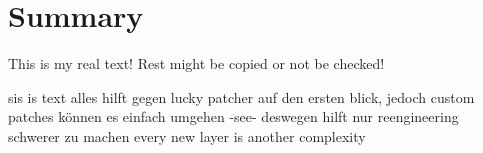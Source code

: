 \section{Summary}\label{section:conclusion-summary}
This is my real text! Rest might be copied or not be checked!


sis is text
alles hilft gegen lucky patcher auf den ersten blick, jedoch custom patches können es einfach umgehen -see- deswegen hilft nur reengineering schwerer zu machen\newline
every new layer is another complexity\newline
